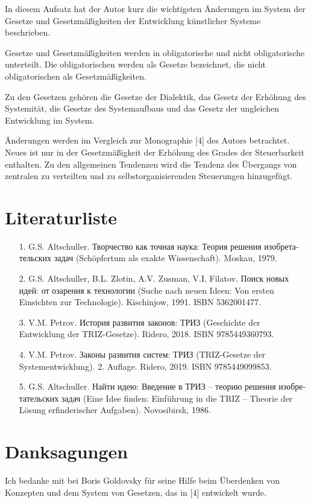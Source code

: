 \documentclass[11pt,a4paper]{article}
\begin{document}
In diesem Aufsatz hat der Autor kurz die wichtigsten Änderungen im System der
Gesetze und Gesetzmäßigkeiten der Entwicklung künstlicher Systeme beschrieben.

Gesetze und Gesetzmäßigkeiten werden in obligatorische und nicht
obligatorische unterteilt.  Die obligatorischen werden als Gesetze bezeichnet,
die nicht obligatorischen als Gesetzmäßig\-keiten.

Zu den Gesetzen gehören die Gesetze der Dialektik, das Gesetz der Erhöhung des
Systemität, die Gesetze des Systemaufbaus und das Gesetz der ungleichen
Entwicklung im System.

Änderungen werden im Vergleich zur Monographie [4] des Autors betrachtet.
Neues ist nur in der Gesetzmäßigkeit der Erhöhung des Grades der Steuerbarkeit
enthalten. Zu den allgemeinen Tendenzen wird die Tendenz des Übergangs von
zentralen zu verteilten und zu selbstorganisierenden Steuerungen hinzugefügt.

\section{Literaturliste}
\begin{itemize}
\item[1.] G.S. Altschuller. \foreignlanguage{russian}{Творчество как точная
  наука: Теория решения изобретательских задач} (Schöpfertum als exakte
  Wissenschaft). Moskau, 1979.
\item[2.] G.S. Altschuller, B.L. Zlotin, A.V. Zusman, V.I. Filatov.
  \foreignlanguage{russian}{Поиск новых идей: от озарения к технологии} (Suche
  nach neuen Ideen: Von ersten Einsichten zur Technologie). Kischinjow,
  1991. ISBN 5362001477.
\item[3.] V.M. Petrov. \foreignlanguage{russian}{История развития законов:
  ТРИЗ} (Geschichte der Entwicklung der TRIZ-Gesetze).  Ridero, 2018. ISBN
  9785449360793.
\item[4.] V.M. Petrov. \foreignlanguage{russian}{Законы развития систем: ТРИЗ}
  (TRIZ-Gesetze der Systementwicklung). 2. Auflage. Ridero, 2019.  ISBN
  9785449099853.
\item[5.] G.S. Altschuller. \foreignlanguage{russian}{Найти идею: Введение в
  ТРИЗ – теорию решения изобретательских задач} (Eine Idee finden: Einführung
  in die TRIZ -- Theorie der Lösung erfinderischer Aufgaben).  Novosibirsk,
  1986. 
\end{itemize}

\section{Danksagungen}

Ich bedanke mit bei Boris Goldovsky für seine Hilfe beim Überdenken von
Konzepten und dem System von Gesetzen, das in [4] entwickelt wurde.
\end{document}
